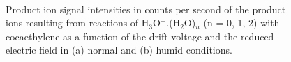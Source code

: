 \begin{figure}[htbp]
\centering
{}\\
\caption{Product ion signal intensities in counts per second of the product ions resulting from reactions of H$_3$O$^+$.(H$_2$O)$_n$ (n = 0, 1, 2) with cocaethylene as a function of the drift voltage and the reduced electric field in (a) normal and (b) humid conditions.}
\label{fig:cocaetEN}
\end{figure}











